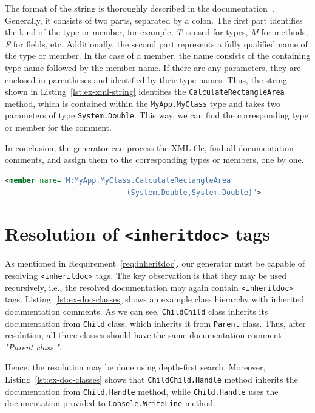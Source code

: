The format of the string is thoroughly described in the documentation~\cite{csharp_xml_docs}.
Generally, it consists of two parts, separated by a colon. 
The first part identifies the kind of the type or member, for example, \textit{T} is used for types, \textit{M} for methods, \textit{F} for fields, etc.
Additionally, the second part represents a fully qualified name of the type or member.
In the case of a member, the name consists of the containing type name followed by the member name.
If there are any parameters, they are enclosed in parentheses and identified by their type names.
Thus, the string shown in Listing~\ref{lst:ex-xml-string} identifies the \texttt{CalculateRectangleArea} method, 
which is contained within the \texttt{MyApp.MyClass} type and takes two parameters of type \texttt{System.Double}.
This way, we can find the corresponding type or member for the comment.

In conclusion, the generator can process the XML file, find all documentation comments, and assign them to the corresponding types or members, one by one.

\begin{listing}[H]
\begin{lstlisting}[language=XML]
<member name="M:MyApp.MyClass.CalculateRectangleArea
                            (System.Double,System.Double)">
\end{lstlisting}
\caption{Example of the ID string}
\label{lst:ex-xml-string}
\end{listing}

\newpage

\section{Resolution of \texttt{<inheritdoc>} tags}
\label{sec:inheritdoc-resolve}

As mentioned in Requirement~\ref{req:inheritdoc}, our generator must be capable of resolving \texttt{<inheritdoc>} tags.
The key observation is that they may be used recursively, i.e., the resolved documentation may again contain \texttt{<inheritdoc>} tags.
Listing~\ref{lst:ex-doc-classes} shows an example class hierarchy with inherited documentation comments.
As we can see, \texttt{ChildChild} class inherits its documentation from \texttt{Child} class, 
which inherits it from \texttt{Parent} class.
Thus, after resolution, all three classes should have the same documentation comment -- \textit{"Parent class."}.

Hence, the resolution may be done using depth-first search.
Moreover, Listing~\ref{lst:ex-doc-classes} shows that \texttt{ChildChild.Handle} method inherits the documentation from \texttt{Child.Handle} method, 
while \texttt{Child.Handle} uses the documentation provided to \texttt{Console.WriteLine} method.

